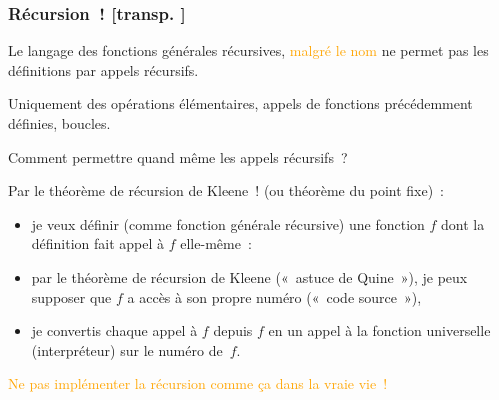 \documentclass[mathserif,a4paper,aspectratio=169]{beamer}
\renewcommand{\frametitle}[1]{\subsubsection*{#1 {\footnotesize[transp. \insertframenumber]}}}
\begin{document}
%
\begin{frame}
\label{recursion-from-kleene-recursion-theorem}
\frametitle{Récursion !}

Le langage des fonctions générales récursives,
\textcolor{orange}{malgré le nom} ne permet pas les définitions par
appels récursifs.

\smallskip

{\footnotesize Uniquement des opérations élémentaires, appels de
  fonctions précédemment définies, boucles.\par}

\bigskip

Comment permettre quand même les appels récursifs ?

\smallskip

\alert{Par le théorème de récursion de Kleene !} (ou théorème du point fixe) :

\begin{itemize}
\item je veux définir (comme fonction générale récursive) une fonction
  $f$ dont la définition fait appel à $f$ elle-même :
\item par le théorème de récursion de Kleene (« astuce de Quine »), je
  peux supposer que $f$ a accès à son propre numéro (« code source »),
\item je convertis chaque appel à $f$ depuis $f$ en un appel à la
  fonction universelle (interpréteur) sur le numéro de $f$.
\end{itemize}

\bigskip

\textcolor{orange}{Ne pas implémenter la récursion comme ça dans la vraie vie !}

\end{frame}
%
\end{document}

